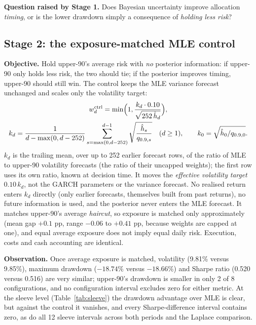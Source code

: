 \documentclass[11pt]{article}
\newcommand{\pbox}[1]{\par\smallskip\noindent\colorbox{boxbg}{\parbox{\dimexpr\textwidth-2\fboxsep}{#1}}\par\smallskip}
\begin{document}
\pbox{\textbf{Question raised by Stage 1.} Does Bayesian uncertainty improve allocation \emph{timing}, or is the lower
drawdown simply a consequence of \emph{holding less risk}?}

\subsection{Stage 2: the exposure-matched MLE control}
\textbf{Objective.} Hold upper-90's average risk with \emph{no} posterior information: if upper-90 only holds less risk,
the two should tie; if the posterior improves timing, upper-90 should still win. The control keeps the MLE variance
forecast unchanged and scales only the volatility target:
\begin{equation}
\begin{gathered}
w^{\text{ctrl}}_d=\min\Bigl(1,\frac{k_d\cdot0.10}{\sqrt{252\,\hat h_d}}\Bigr),\\
k_d=\frac{1}{d-\max(0,d-252)}\sum_{s=\max(0,d-252)}^{d-1}\sqrt{\frac{\hat h_s}{q_{0.9,s}}}\quad(d\ge1),\qquad k_0=\sqrt{\hat h_0/q_{0.9,0}}.
\end{gathered}
\end{equation}
$k_d$ is the trailing mean, over up to 252 earlier forecast rows, of the ratio of MLE to upper-90 volatility forecasts
(the ratio of their uncapped weights); the first row uses its own ratio, known at decision time. It moves the
\emph{effective volatility target} $0.10\,k_d$, not the GARCH parameters or the variance forecast. No realised return
enters $k_d$ directly (only earlier forecasts, themselves built from past returns), no future information is used,
and the posterior never enters the MLE forecast. It matches upper-90's average \emph{haircut}, so exposure is
matched only approximately (mean gap $+0.1$ pp, range $-0.06$ to $+0.41$ pp, because weights are capped at one), and
equal average exposure does not imply equal daily risk. Execution, costs and cash accounting are identical.

\begin{table}[h]\centering\small
\resizebox{.92\textwidth}{!}{}
\caption{Stage 2, 2017--22: the same metrics for upper-90 and the exposure-matched control.}\label{tab:stage2}
\end{table}

\textbf{Observation.} Once average exposure is matched, volatility (9.81\% versus 9.85\%), maximum drawdown
($-18.74\%$ versus $-18.66\%$) and Sharpe ratio (0.520 versus 0.516) are very similar; upper-90's drawdown is smaller
in only 2 of 8 configurations, and no configuration interval excludes zero for either metric. At the sleeve level
(Table~\ref{tab:sleeve}) the drawdown advantage over MLE is clear, but against the control it vanishes, and every
Sharpe-difference interval contains zero, as do all 12 sleeve intervals across both periods and the Laplace comparison.
\end{document}
